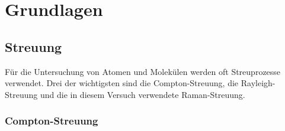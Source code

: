 \documentclass[.../bericht]{subfilies}
\begin{document}
  \chapter{Grundlagen}
    \section{Streuung}

      Für die Untersuchung von Atomen und Molekülen werden oft Streuprozesse verwendet. Drei der wichtigsten sind die Compton-Streuung, die Rayleigh-Streuung und die in diesem Versuch verwendete Raman-Streuung.


      \subsection{Compton-Streuung}
      \label{ssec:Compton-Streuung}
\end{document}
